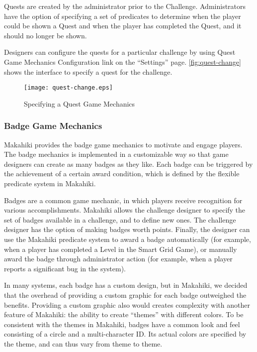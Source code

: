 Quests are created by the administrator prior to the Challenge. Administrators have the option of specifying a set of predicates to determine when the player could be shown a Quest and when the player has completed the Quest, and it should no longer be shown.

Designers can configure the quests for a particular challenge by using Quest Game Mechanics Configuration link on the ``Settings'' page. \autoref{fig:quest-change} shows the interface to specify a quest for the challenge.

\begin{figure}[!ht]
  \center
  \texttt{[image: quest-change.eps]}
  \caption{Specifying a Quest Game Mechanics}
  \label{fig:quest-change}
\end{figure}

\clearpage

\subsubsection{Badge Game Mechanics}

Makahiki provides the badge game mechanics to motivate and engage players. The badge mechanics is implemented in a customizable way so that  game designers can create as many badges as they like. Each badge can be triggered by the achievement of a certain award condition, which is defined by the flexible predicate system in Makahiki. 

Badges are a common game mechanic, in which players receive recognition for various accomplishments. Makahiki allows the challenge designer to specify the set of badges available in a challenge, and to define new ones. The challenge designer has the option of making badges worth points. Finally, the designer can use the Makahiki predicate system to award a badge automatically (for example, when a player has completed a Level in the Smart Grid Game), or manually award the badge through administrator action (for example, when a player reports a significant bug in the system).

In many systems, each badge has a custom design, but in Makahiki, we decided that the overhead of providing a custom graphic for each badge outweighed the benefits. Providing a custom graphic also would creates complexity with another feature of Makahiki: the ability to create ``themes'' with different colors. To be consistent with the themes in Makahiki, badges have a common look and feel consisting of a circle and a multi-character ID. Its actual colors are specified by the theme, and can thus vary from theme to theme.

